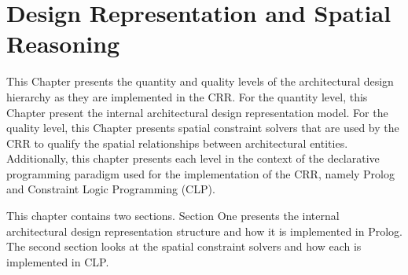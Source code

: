 \documentclass[12pt]{ucthesis}
\begin{document}



\chapter{Design Representation and Spatial Reasoning} \label{representation and reasoning}
This Chapter presents the quantity and quality levels of the architectural design hierarchy as they are implemented in the CRR. For the quantity level, this Chapter present the internal architectural design representation model. For the quality level, this Chapter presents spatial constraint solvers that are used by the CRR to qualify the spatial relationships between architectural entities. Additionally, this chapter presents each level in the context of the declarative programming paradigm used for the implementation of the CRR, namely Prolog and Constraint Logic Programming (CLP). 

This chapter contains two sections. Section One presents the internal architectural design representation structure and how it is implemented in Prolog. The second section looks at the spatial constraint solvers and how each is implemented in CLP.
\end{document}
